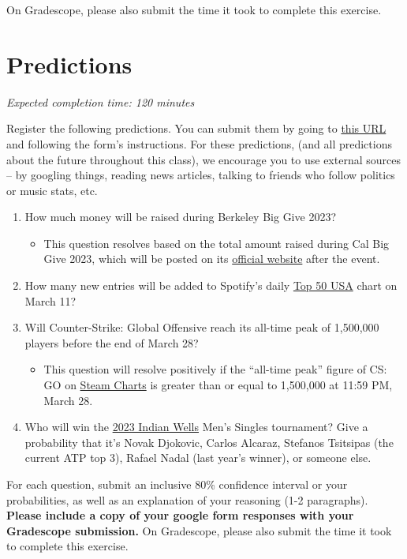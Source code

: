 \documentclass[11pt]{article}
\begin{document}
On Gradescope, please also submit the time it took to complete this exercise.

\section*{Predictions}

\emph{Expected completion time: 120 minutes}

Register the following predictions. You can submit them by going to \href{https://forms.gle/RzQGQGkE3hw9FwQXA}{this URL} and following the form's instructions. For these predictions, (and all predictions about the future throughout this class), we encourage you to use external sources -- by googling things, reading news articles, talking to friends who follow politics or music stats, etc.

\begin{enumerate}
     \item How much money will be raised during Berkeley Big Give 2023?
     \begin{itemize}
         \item This question resolves based on the total amount raised during Cal Big Give 2023, which will be posted on its \href{https://givingday.berkeley.edu/giving-day/60202}{official website} after the event.
     \end{itemize}
     \item How many new entries will be added to Spotify's daily  \href{https://open.spotify.com/playlist/37i9dQZEVXbLRQDuF5jeBp}{Top 50 USA} chart on March 11?
     \item Will Counter-Strike: Global Offensive reach its all-time peak of 1,500,000 players before the end of March 28?
     \begin{itemize}
         \item This question will resolve positively if the ``all-time peak'' figure of CS: GO on \href{https://steamcharts.com/app/730}{Steam Charts} is greater than or equal to 1,500,000 at 11:59 PM, March 28.
    \end{itemize}
	\item Who will win the \href{https://bnpparibasopen.com/players/current/?assoc=atp&type=singles}{2023 Indian Wells} Men's Singles tournament? Give a probability that it's Novak Djokovic, Carlos Alcaraz, Stefanos Tsitsipas (the current ATP top 3), Rafael Nadal (last year's winner), or someone else.
\end{enumerate}

For each question, submit an inclusive 80\% confidence interval or your probabilities, as well as an explanation of your reasoning (1-2 paragraphs). \textbf{Please include a copy of your google form responses with your Gradescope submission.} On Gradescope, please also submit the time it took to complete this exercise.
\end{document}
